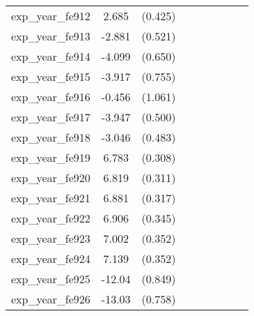 {\begin{tabular}{l*{4}{cc}}
exp\_year\_fe912&    2.685\sym{***}&  (0.425)&                  &         &                  &         &                  &         \\
exp\_year\_fe913&   -2.881\sym{***}&  (0.521)&                  &         &                  &         &                  &         \\
exp\_year\_fe914&   -4.099\sym{***}&  (0.650)&                  &         &                  &         &                  &         \\
exp\_year\_fe915&   -3.917\sym{***}&  (0.755)&                  &         &                  &         &                  &         \\
exp\_year\_fe916&   -0.456         &  (1.061)&                  &         &                  &         &                  &         \\
exp\_year\_fe917&   -3.947\sym{***}&  (0.500)&                  &         &                  &         &                  &         \\
exp\_year\_fe918&   -3.046\sym{***}&  (0.483)&                  &         &                  &         &                  &         \\
exp\_year\_fe919&    6.783\sym{***}&  (0.308)&                  &         &                  &         &                  &         \\
exp\_year\_fe920&    6.819\sym{***}&  (0.311)&                  &         &                  &         &                  &         \\
exp\_year\_fe921&    6.881\sym{***}&  (0.317)&                  &         &                  &         &                  &         \\
exp\_year\_fe922&    6.906\sym{***}&  (0.345)&                  &         &                  &         &                  &         \\
exp\_year\_fe923&    7.002\sym{***}&  (0.352)&                  &         &                  &         &                  &         \\
exp\_year\_fe924&    7.139\sym{***}&  (0.352)&                  &         &                  &         &                  &         \\
exp\_year\_fe925&   -12.04\sym{***}&  (0.849)&                  &         &                  &         &                  &         \\
exp\_year\_fe926&   -13.03\sym{***}&  (0.758)&                  &         &                  &         &                  &         \\

\end{tabular}}
